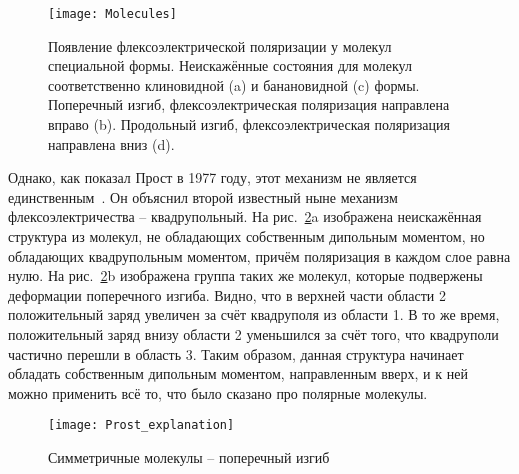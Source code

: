 \begin{figure}[ht]
	\centering
	\texttt{[image: Molecules]}
	\caption{Появление флексоэлектрической поляризации у молекул специальной формы. Неискажённые состояния для молекул соответственно клиновидной (a) и банановидной (c) формы. Поперечный изгиб, флексоэлектрическая поляризация направлена вправо (b). Продольный изгиб, флексоэлектрическая поляризация направлена вниз (d).}
	\label{pic-Meyer}
\end{figure}

Однако, как показал Прост в 1977 году, этот механизм не является единственным~\cite{Prost77}.
Он объяснил второй известный ныне механизм флексоэлектричества -- квадрупольный.
На рис.~\ref{Prost_explanation}a изображена неискажённая структура из молекул, не обладающих собственным дипольным моментом, но обладающих квадрупольным моментом, причём поляризация в каждом слое равна нулю.
На рис.~\ref{Prost_explanation}b изображена группа таких же молекул, которые подвержены деформации поперечного изгиба.
Видно, что в верхней части области 2 положительный заряд увеличен за счёт квадруполя из области 1.
В то же время, положительный заряд внизу области 2 уменьшился за счёт того, что квадруполи частично перешли в область 3.
Таким образом, данная структура начинает обладать собственным дипольным моментом, направленным вверх, и к ней можно применить всё то, что было сказано про полярные молекулы.
\begin{figure}[ht]
	\centering
	\texttt{[image: Prost\_explanation]}
	\caption{Симметричные молекулы -- поперечный изгиб}
	\label{Prost_explanation}
\end{figure}

